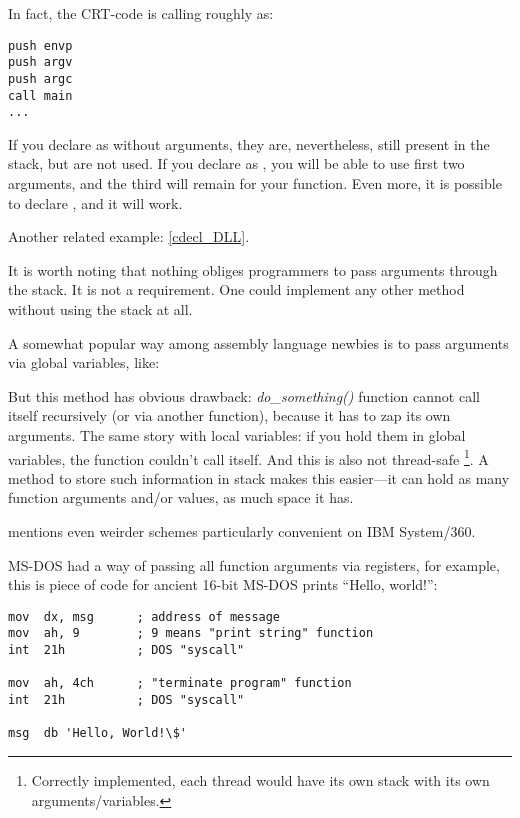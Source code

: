 In fact, the \ac{CRT}-code is calling \main roughly as:
	
\begin{lstlisting}[style=customasmx86]
push envp
push argv
push argc
call main
...
\end{lstlisting}

If you declare \main as \main without arguments, they are, nevertheless, still present in the stack, but are not used.
If you declare \main as  ,
you will be able to use first two arguments, and the third will remain  for your function.
Even more, it is possible to declare , and it will work.

Another related example: \ref{cdecl_DLL}.


It is worth noting that nothing obliges programmers to pass arguments through the stack. It is not a requirement.
One could implement any other method without using the stack at all.

A somewhat popular way among assembly language newbies is to pass arguments via global variables, like:



But this method has obvious drawback: \emph{do\_something()} function cannot call itself recursively (or via another function),
because it has to zap its own arguments.
The same story with local variables: if you hold them in global variables, the function couldn't call itself.
And this is also not thread-safe
\footnote{Correctly implemented, each thread would have its own stack with its own arguments/variables.}.
A method to store such information in stack makes this easier---it can hold as many function arguments and/or values,
as much space it has.

 mentions even weirder schemes particularly convenient on IBM System/360.


MS-DOS had a way of passing all function arguments via registers, for example, this is piece of
code for ancient 16-bit MS-DOS prints ``Hello, world!'':

\begin{lstlisting}[style=customasmx86]
mov  dx, msg      ; address of message
mov  ah, 9        ; 9 means "print string" function
int  21h          ; DOS "syscall"

mov  ah, 4ch      ; "terminate program" function
int  21h          ; DOS "syscall"

msg  db 'Hello, World!\$'
\end{lstlisting}

